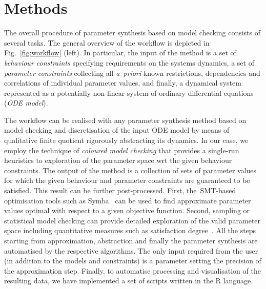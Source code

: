\documentclass{llncs}
\begin{document}


\section{Methods}
\label{sec:methods}

The overall procedure of parameter synthesis based on model checking consists of several tasks. The general overview of the workflow is depicted in Fig.~\ref{fig:workflow} (left).
In particular, the input of the method is a set of \emph{behaviour constraints} specifying requirements on the systems dynamics, a set of \emph{parameter constraints} collecting all \emph{a~priori} known restrictions, dependencies and correlations of individual parameter values, and finally, a dynamical system represented as a potentially non-linear system of ordinary differential equations (\emph{ODE model}).  


The workflow can be realised with any parameter synthesis method based on model checking and discretisation of the input ODE model by means of qualitative finite quotient rigorously abstracting its dynamics. In our case, we employ the technique of \emph{coloured model checking} that provides a single-run heuristics to exploration of the parameter space wrt the given behaviour constraints. The output of the method is a collection of sets of parameter values for which the given behaviour and parameter constraints are guaranteed to be satisfied. This result can be further post-processed. First, the~SMT-based optimisation tools such as Symba~\cite{LiA15} can be used to find approximate parameter values optimal with respect to a given objective function. Second, sampling or statistical model checking can provide detailed exploration of the valid parameter space including quantitative measures such as satisfaction degree~\cite{RBF+09}. All the steps starting from approximation, abstraction and finally the parameter synthesis are automatised by the respective algorithms. The only input required from the user (in addition to the models and constraints) is a parameter setting the precision of the approximation step. Finally, to automatise processing and visualisation of the resulting data, we have implemented a set of scripts written in the R language.  
\end{document}

